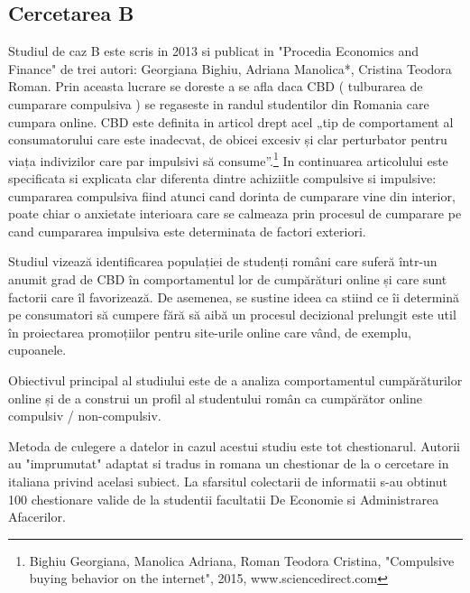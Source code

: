 \documentclass[a4paper, 12pt]{article}
\begin{document}
	\subsection {Cercetarea B}
	\qquad Studiul de caz B este scris in 2013 si publicat in "Procedia Economics and Finance" de trei autori: Georgiana Bighiu, Adriana Manolica*, Cristina Teodora Roman. Prin aceasta lucrare se doreste a se afla daca CBD ( tulburarea de cumparare compulsiva ) se regaseste in randul studentilor din Romania care cumpara online. CBD este definita in articol drept acel „tip de comportament al consumatorului care este inadecvat, de obicei excesiv și clar perturbator pentru viața indivizilor care par impulsivi să consume”.\footnote{Bighiu Georgiana, Manolica Adriana, Roman Teodora Cristina, "Compulsive buying behavior on the internet", 2015, www.sciencedirect.com} In continuarea articolului  este specificata si explicata clar diferenta dintre achiziitle compulsive si impulsive: cumpararea compulsiva fiind atunci cand dorinta de cumparare vine din interior, poate chiar o anxietate interioara care se calmeaza prin procesul de cumparare pe cand cumpararea impulsiva este determinata de factori exteriori.
	
	\quad Studiul vizează identificarea  populației de studenți români care suferă într-un anumit grad de CBD în comportamentul lor de cumpărături online și care sunt factorii care îl favorizează. De asemenea, se sustine ideea ca stiind ce îi determină pe consumatori să cumpere fără să aibă un procesul decizional prelungit este util în proiectarea promoțiilor pentru site-urile online care vând, de exemplu, cupoanele.  
	
	\quad Obiectivul principal al studiului este de a analiza comportamentul cumpărăturilor online și de a construi un profil al studentului român ca cumpărător online compulsiv / non-compulsiv.
	
	\quad Metoda de culegere a datelor in cazul acestui studiu este tot chestionarul. Autorii au "imprumutat" adaptat si tradus in romana un chestionar de la o cercetare in italiana privind acelasi subiect. La sfarsitul colectarii de informatii s-au obtinut 100 chestionare valide de la studentii facultatii De Economie si Administrarea Afacerilor. 
	
\end{document}
